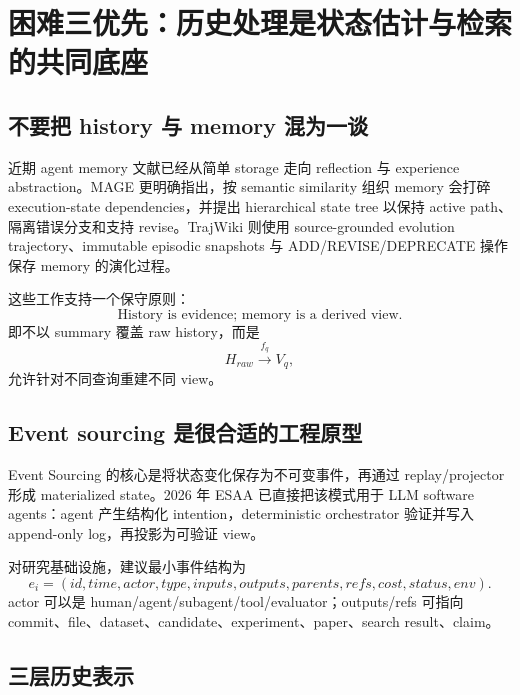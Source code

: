 \documentclass[11pt,a4paper]{ctexart}
\begin{document}
\section{困难三优先：历史处理是状态估计与检索的共同底座}

\subsection{不要把 history 与 memory 混为一谈}

近期 agent memory 文献已经从简单 storage 走向 reflection 与 experience abstraction\parencite{luo2026memorysurvey}。MAGE 更明确指出，按 semantic similarity 组织 memory 会打碎 execution-state dependencies，并提出 hierarchical state tree 以保持 active path、隔离错误分支和支持 revise\parencite{chen2026mage}。TrajWiki 则使用 source-grounded evolution trajectory、immutable episodic snapshots 与 ADD/REVISE/DEPRECATE 操作保存 memory 的演化过程\parencite{sun2026trajwiki}。

这些工作支持一个保守原则：
\begin{equation}
\boxed{\text{History is evidence; memory is a derived view.}}
\end{equation}
即不以 summary 覆盖 raw history，而是
\begin{equation}
 H_{raw}\xrightarrow{f_q}V_q,
\end{equation}
允许针对不同查询重建不同 view。

\subsection{Event sourcing 是很合适的工程原型}

Event Sourcing 的核心是将状态变化保存为不可变事件，再通过 replay/projector 形成 materialized state\parencite{fowler2005eventsourcing}。2026 年 ESAA 已直接把该模式用于 LLM software agents：agent 产生结构化 intention，deterministic orchestrator 验证并写入 append-only log，再投影为可验证 view\parencite{santos2026esaa}。

对研究基础设施，建议最小事件结构为
\begin{equation}
 e_i=(id,time,actor,type,inputs,outputs,parents,refs,cost,status,env).
\end{equation}
actor 可以是 human/agent/subagent/tool/evaluator；outputs/refs 可指向 commit、file、dataset、candidate、experiment、paper、search result、claim。

\subsection{三层历史表示}
\end{document}

